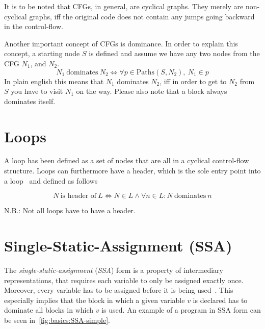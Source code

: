 It is to be noted that CFGs, in general, are cyclical graphs.
They merely are non-cyclical graphs, iff the original code does not contain any jumps going backward in the control-flow.

Another important concept of CFGs is dominance.
In order to explain this concept, a starting node $S$ is defined and assume we have any two nodes from the CFG $N_1$, and $N_2$.
$$N_1~\text{dominates}~N_2 \Longleftrightarrow \forall p \in \text{Paths}(S, N_2),~N_1 \in p$$
In plain english this means that $N_1$ dominates $N_2$, iff in order to get to $N_2$ from $S$ you have to visit $N_1$ on the way.
Please also note that a block always dominates itself.


\section{Loops}\label{sec:basics:loops}

A loop has been defined as a set of nodes that are all in a cyclical control-flow structure.
Loops can furthermore have a header, which is the sole entry point into a loop~\cite{aebi18bachelorarbeit} and defined as follows

$$N~\text{is header of}~L \Longleftrightarrow N \in L \wedge \forall n \in L: N~\text{dominates}~n$$

N.B.: Not all loops have to have a header.

\section{Single-Static-Assignment (SSA)}\label{sec:basics:ssa}

The \textit{single-static-assignment} (\textit{SSA}) form is a property of intermediary representations, that requires each variable to only be assigned exactly once.
Moreover, every variable has to be assigned before it is being used~\cite{cytron91}.
This especially implies that the block in which a given variable $v$ is declared has to dominate all blocks in which $v$ is used.
An example of a program in SSA form can be seen in~\cref{fig:basics:SSA-simple}.

